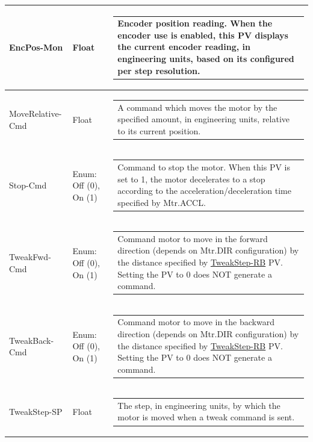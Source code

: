 \documentclass[openany]{article}
\begin{document}
\begin{longtable}{| m{4.5cm} m{2.5cm}  m{8.5cm} |}
        EncPos-Mon & Float & \begin{tabular}{@{}m{6cm}@{}}
                Encoder position reading. When the encoder use is enabled, this PV displays the current encoder reading, in engineering units, based on its configured per step resolution.
            \end{tabular} \hypertarget{pv:move-relative-cmd}{}\\ \hline
        MoveRelative-Cmd & Float & \begin{tabular}{@{}m{6cm}@{}}
                A command which moves the motor by the specified amount, in engineering units, relative to its current position.
            \end{tabular} \hypertarget{pv:stop-cmd}{}\\ \hline
        Stop-Cmd & Enum: Off (0), On (1) & \begin{tabular}{@{}m{6cm}@{}}
                Command to stop the motor. When this PV is set to 1, the motor decelerates to a stop according to the acceleration/deceleration time specified by Mtr.ACCL.
            \end{tabular} \hypertarget{pv:tweak-fwd-cmd}{}\\ \hline
        TweakFwd-Cmd & Enum: Off (0), On (1) & \begin{tabular}{@{}m{6cm}@{}}
                Command motor to move in the forward direction (depends on Mtr.DIR configuration) by the distance specified by \hyperlink{pv:tweak-step}{TweakStep-RB} PV. Setting the PV to 0 does NOT generate a command.
            \end{tabular} \hypertarget{pv:tweak-back-cmd}{}\\ \hline
        TweakBack-Cmd & Enum: Off (0), On (1) & \begin{tabular}{@{}m{6cm}@{}}
                Command motor to move in the backward direction (depends on Mtr.DIR configuration) by the distance specified by \hyperlink{pv:tweak-step}{TweakStep-RB} PV. Setting the PV to 0 does NOT generate a command.
            \end{tabular} \hypertarget{pv:tweak-step}{}\\ \hline
        TweakStep-SP & Float & \begin{tabular}{@{}m{6cm}@{}}
                The step, in engineering units, by which the motor is moved when a tweak command is sent.
            \end{tabular} \hypertarget{}{}\\ \hline

\end{longtable}
\end{document}
